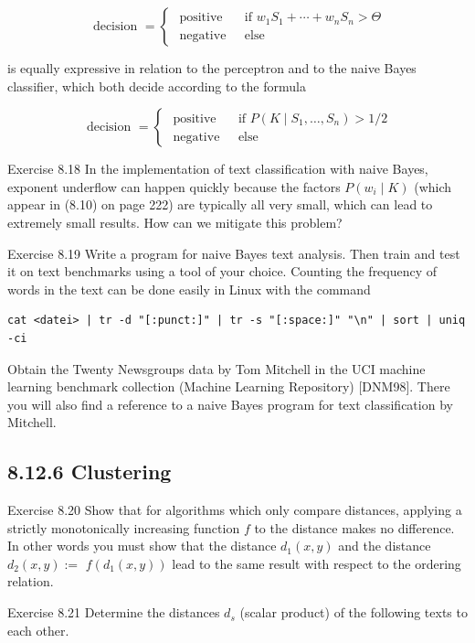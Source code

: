 \documentclass[10pt]{book}
\begin{document}
\begin{center}
\begin{enumerate}
\begin{center}
\begin{center}
\begin{center}
$$
\text { decision }= \begin{cases}\text { positive } & \text { if } w_{1} S_{1}+\cdots+w_{n} S_{n}>\Theta \\ \text { negative } & \text { else }\end{cases}
$$

is equally expressive in relation to the perceptron and to the naive Bayes classifier, which both decide according to the formula

$$
\text { decision }= \begin{cases}\text { positive } & \text { if } P\left(K \mid S_{1}, \ldots, S_{n}\right)>1 / 2 \\ \text { negative } & \text { else }\end{cases}
$$

Exercise 8.18 In the implementation of text classification with naive Bayes, exponent underflow can happen quickly because the factors $P\left(w_{i} \mid K\right)$ (which appear in (8.10) on page 222) are typically all very small, which can lead to extremely small results. How can we mitigate this problem?

Exercise 8.19 Write a program for naive Bayes text analysis. Then train and test it on text benchmarks using a tool of your choice. Counting the frequency of words in the text can be done easily in Linux with the command

\begin{verbatim}
cat <datei> | tr -d "[:punct:]" | tr -s "[:space:]" "\n" | sort | uniq -ci
\end{verbatim}

Obtain the Twenty Newsgroups data by Tom Mitchell in the UCI machine learning benchmark collection (Machine Learning Repository) [DNM98]. There you will also find a reference to a naive Bayes program for text classification by Mitchell.

\subsection*{8.12.6 Clustering}
Exercise 8.20 Show that for algorithms which only compare distances, applying a strictly monotonically increasing function $f$ to the distance makes no difference. In other words you must show that the distance $d_{1}(x, y)$ and the distance $d_{2}(x, y):=$ $f\left(d_{1}(x, y)\right)$ lead to the same result with respect to the ordering relation.

Exercise 8.21 Determine the distances $d_{s}$ (scalar product) of the following texts to each other.\\


\end{center}
\end{center}
\end{center}
\end{enumerate}
\end{center}
\end{document}
